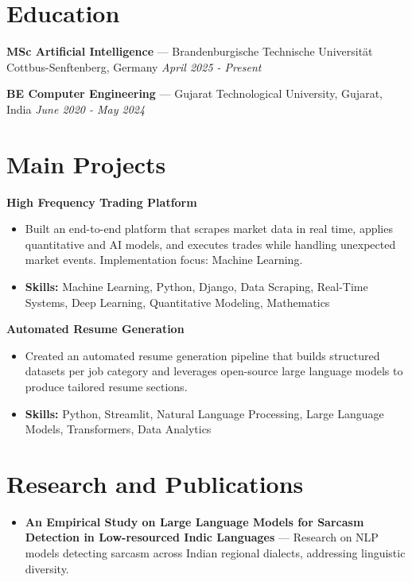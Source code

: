 \documentclass[a4paper,10pt]{article}
\begin{document}
\section*{Education}
\textbf{MSc Artificial Intelligence} — Brandenburgische Technische Universität Cottbus-Senftenberg, Germany \hfill \textit{April 2025 - Present}\par
\vspace{1.5pt}
\textbf{BE Computer Engineering} — Gujarat Technological University, Gujarat, India \hfill \textit{June 2020 - May 2024}\par

\section*{Main Projects}
\textbf{High Frequency Trading Platform}\par
\vspace{1pt}
\begin{itemize}
  \item Built an end-to-end platform that scrapes market data in real time, applies quantitative and AI models, and executes trades while handling unexpected market events. Implementation focus: Machine Learning.
  \item \textbf{Skills:} Machine Learning, Python, Django, Data Scraping, Real-Time Systems, Deep Learning, Quantitative Modeling, Mathematics
\end{itemize}
\vspace{3pt}
\textbf{Automated Resume Generation}\par
\vspace{1pt}
\begin{itemize}
  \item Created an automated resume generation pipeline that builds structured datasets per job category and leverages open-source large language models to produce tailored resume sections.
  \item \textbf{Skills:} Python, Streamlit, Natural Language Processing, Large Language Models, Transformers, Data Analytics
\end{itemize}

\section*{Research and Publications}
\begin{itemize}
\item \textbf{An Empirical Study on Large Language Models for Sarcasm Detection in Low-resourced Indic Languages} — Research on NLP models detecting sarcasm across Indian regional dialects, addressing linguistic diversity.
\end{itemize}
\end{document}
